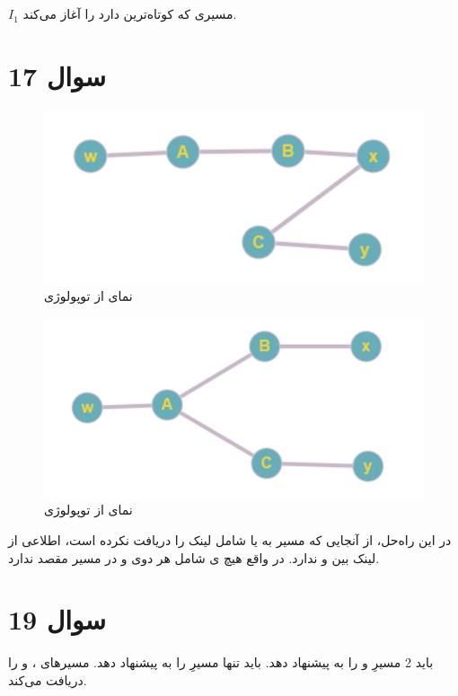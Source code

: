 \documentclass{article}
\begin{document}
\subsection{}
$I_{1}$ مسیری که کوتاه‌ترین  دارد را آغاز می‌کند.
\section{سوال 17}
\begin{figure}[H]
    \centering
    \includegraphics[width=1.0\textwidth]{figures/a.jpg}
    \caption
	{
نمای  از توپولوژی
	}
    \label{fig:fig1}
\end{figure}
\begin{figure}[H]
    \centering
    \includegraphics[width=1.0\textwidth]{figures/b.jpg}
    \caption
	{
نمای  از توپولوژی
	}
    \label{fig:fig1}
\end{figure}
در این راه‌حل، از آنجایی که   مسیر به  یا  شامل لینک  را دریافت نکرده است، اطلاعی از لینک بین  و  ندارد. در واقع  هیچ ی شامل هر دوی  و  در مسیر مقصد ندارد.
\section{سوال 19}
 باید 2 مسیرِ  و  را به  پیشنهاد دهد.
\newline
{} باید تنها مسیرِ  را به  پیشنهاد دهد.
\newline
{} مسیرهای ،  و  را دریافت می‌کند.
\end{document}
